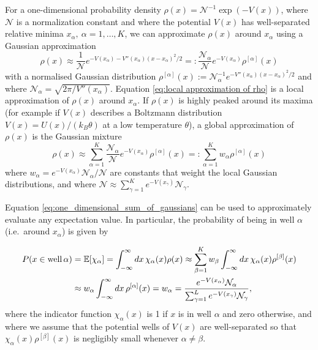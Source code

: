 For a one-dimensional probability density $\rho(x)=\mathcal{N}^{-1}\exp(-V(x))$,
where $\mathcal{N}$ is a normalization constant and where the potential
$V(x)$ has well-separated relative minima $x_{\alpha},\ \alpha=1,\dots,K$,
we can approximate $\rho(x)$ around $x_{\alpha}$ using a Gaussian
approximation
\begin{equation}
\rho(x)\approx\frac{1}{\mathcal{{N}}}e^{-V(x_{\alpha})-V''(x_{\alpha})(x-x_{\alpha})^{2}/2}=:\frac{{{\mathcal{N}}_{\alpha}}}{\mathcal{{N}}}e^{-V(x_{\alpha})}\rho^{[\alpha]}(x)\label{eq:local approximation of rho}
\end{equation}
with a normalised Gaussian distribution $\rho^{[\alpha]}(x):=\mathcal{N}_{\alpha}^{-1}e^{-V''(x_{\alpha})(x-x_{\alpha})^{2}/2}$
and where $\mathcal{N}_{\alpha}=\sqrt{2\pi/V''(x_{\alpha})}$. Equation
\ref{eq:local approximation of rho} is a local approximation of $\rho(x)$
around $x_{\alpha}$. If $\rho(x)$ is highly peaked around its maxima
(for example if $V(x)$ describes a Boltzmann distribution $V(x)=U(x)/(k_{B}\theta)$
at a low temperature $\theta$), a global approximation of $\rho(x)$
is the Gaussian mixture
\begin{equation}
\rho(x)\approx\sum_{\alpha=1}^{K}\frac{{\mathcal{{N}}}_{\alpha}}{\mathcal{{N}}}e^{-V(x_{\alpha})}\rho^{[\alpha]}(x)=:\sum_{\alpha=1}^{K}w_{\alpha}\rho^{[\alpha]}(x)\label{eq:one_dimensional_sum_of_gaussians}
\end{equation}
where $w_{\alpha}=e^{-V(x_{\alpha})}\mathcal{N}_{\alpha}/\mathcal{{N}}$
are constants that weight the local Gaussian distributions, and where
$\mathcal{N}\approx\sum_{\gamma=1}^{K}e^{-V(x_{\gamma})}\mathcal{N}_{\gamma}$. 

Equation \eqref{eq:one_dimensional_sum_of_gaussians} can be used
to approximately evaluate any expectation value. In particular, the
probability of being in well $\alpha$ (i.e.~around $x_{\alpha}$)
is given by

\begin{align}
P(x\in\text{{well\,}}\alpha) & =\mathbb{E}[\chi_{\alpha}]=\int_{-\infty}^{\infty}dx\,\chi_{\alpha}(x)\rho(x)\approx\sum_{\beta=1}^{K}w_{\beta}\int_{-\infty}^{\infty}dx\,\chi_{\alpha}(x)\rho^{[\beta]}(x)\\
 & \approx w_{\alpha}\int_{-\infty}^{\infty}dx\,\rho^{[\alpha]}(x)=w_{\alpha}=\frac{{e^{-V(x_{\alpha})}\mathcal{N}_{\alpha}}}{\sum_{\gamma=1}^{L}e^{-V(x_{\gamma})}\mathcal{N}_{\gamma}},\label{eq:one_dimensional_well_probability}
\end{align}
where the indicator function $\chi_{\alpha}(x)$ is 1 if $x$ is in
well $\alpha$ and zero otherwise, and where we assume that the potential
wells of $V(x)$ are well-separated so that $\chi_{\alpha}(x)\rho^{[\beta]}(x)$
is negligibly small whenever $\alpha\neq\beta$.

